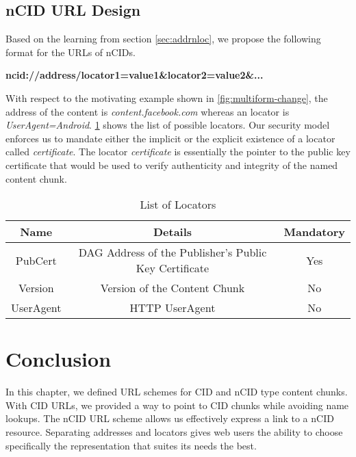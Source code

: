 \subsection{nCID URL Design}
Based on the learning from section \ref{sec:addrnloc}, we propose the
following format for the URLs of nCIDs.
\begin{center}
  \textbf{ncid://address/locator1=value1\&locator2=value2\&...}
\end{center}
With respect to the motivating example shown in
\ref{fig:multiform-change}, the address of the content is
\emph{content.facebook.com} whereas an locator is
\emph{UserAgent=Android}. \ref{tab:locators} shows the list of
possible locators. Our security model enforces us to mandate either
the implicit or the explicit existence of a locator called
\emph{certificate}. The locator \emph{certificate} is essentially the
pointer to the public key certificate that would be used to verify
authenticity and integrity of the named content chunk.

\begin{table}
  \begin{center}
    \begin{tabular}
      {c | c | c}
      Name & Details & Mandatory \\
      \hline
      PubCert & DAG Address of the Publisher's Public Key Certificate & Yes \\
      Version & Version of the Content Chunk & No\\
      UserAgent & HTTP UserAgent & No\\
    \end{tabular}
  \end{center}
  \caption{List of Locators}
  \label{tab:locators}
\end{table}

\section{Conclusion}

In this chapter, we defined URL schemes for CID and nCID type content
chunks. With CID URLs, we provided a way to point to CID chunks while
avoiding name lookups. The nCID URL scheme allows us effectively
express a link to a nCID resource. Separating addresses and locators
gives web users the ability to choose specifically the representation
that suites its needs the best.

